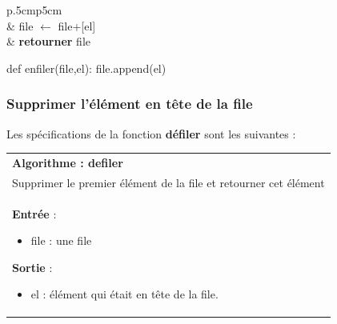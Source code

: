 \documentclass[10pt,fleqn]{article} %
\begin{document}
\vspace{.5cm}

\noindent \begin{minipage}[c]{.48\linewidth}
\begin{pseudo}
\begin{tabular}{p{.5cm}p{5cm}}
\hline
{}  \\
& file $\leftarrow$ file+[el] \\
& \textbf{retourner} file \\
\hline
\end{tabular}
\end{pseudo}
\end{minipage}\hfill
\begin{minipage}[c]{.48\linewidth}
\begin{py}
\begin{python}
def enfiler(file,el):
    file.append(el)
\end{python}
\end{py}
\end{minipage}

\subsubsection{Supprimer l'élément en tête de la file}
Les spécifications de la fonction \textbf{défiler} sont les suivantes :

\begin{tabular}{p{\linewidth}}
\hline
\textbf{Algorithme : defiler} \\
Supprimer le premier élément de la file et retourner cet élément\\
\hline
\textbf{Entrée} : 
\begin{itemize}
\item file : une file
\end{itemize}
\textbf{Sortie} : 
\begin{itemize}
\item el : élément qui était en tête de la file.
\end{itemize} \\
\hline 
\end{tabular}

\vspace{.5cm}
\end{document}
